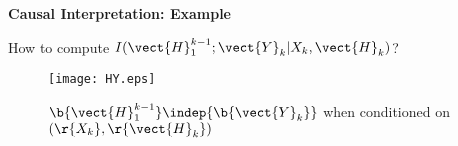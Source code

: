 \documentclass[landscape,dvips,a4]{seminar}
\begin{document}
\begin{slide}
  \begin{center}
    \textbf{\Large Causal Interpretation: Example}
  \end{center}
 \vspace{3mm}

How to compute $I(\vect{H}_1^{k-1}; \vect{Y}_k | X_k, \vect{H}_k)$?
\begin{overlay}{1}
\begin{figure*}[t]
  \centering





  \texttt{[image: HY.eps]}
  \caption{${\b{\vect{H}_1^{k-1}}} \indep {\b{\vect{Y}_k}}$ when
   conditioned on $({\r{X_k}},{\r{\vect{H}_k}})$}
  \label{fig:fig5}
\end{figure*}
\end{overlay}



\end{slide}
\end{document}
